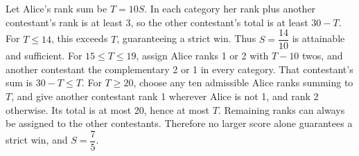 Let Alice's rank sum be $ T=10S $. In each category her rank plus another contestant's rank is at least 3, so the other contestant's total is at least $ 30-T $. For $ T\le14 $, this exceeds $ T $, guaranteeing a strict win. Thus $ S=\dfrac{14}{10}$ is attainable and sufficient. For $ 15\le T\le19 $, assign Alice ranks 1 or 2 with $ T-10 $ twos, and another contestant the complementary 2 or 1 in every category. That contestant's sum is $ 30-T\le T $. For $ T\ge20 $, choose any ten admissible Alice ranks summing to $ T $, and give another contestant rank 1 wherever Alice is not 1, and rank 2 otherwise. Its total is at most 20, hence at most $ T $. Remaining ranks can always be assigned to the other contestants. Therefore no larger score alone guarantees a strict win, and $\boxed{S=\dfrac{7}{5}}$.
